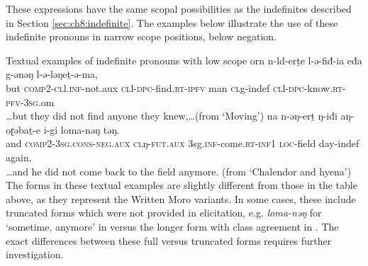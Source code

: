 These expressions have the same scopal possibilities as the indefinites described in Section \ref{sec:ch8:indefinite}. The examples below illustrate the use of these indefinite pronouns in narrow scope positions, below negation.

\ea Textual examples of indefinite pronouns with low scope
\ea \gll orn n-ld-erṯe l-ǝ-fiđ-ia eđa g-ǝnǝŋ l-ǝ-lǝŋeṯ-ǝ-ma,\\
but \textsc{comp}2-\textsc{cl}l.\textsc{inf}-not.aux \textsc{cl}l-\textsc{dpc}-find.\textsc{rt}-\textsc{ipfv} man \textsc{cl}g-indef \textsc{cl}l-\textsc{dpc}-know.\textsc{rt}-\textsc{pfv}-3\textsc{sg}.om\\
\glt \ldots but they did not find anyone they knew,\ldots \hfill (from `Moving')
\ex \gll  na n-ǝŋ-erṯ ŋ-iđi aŋ-oɽǝbaṯ-e i-gi loma-nǝŋ tǝŋ.\\
and \textsc{comp}2-3\textsc{sg}.\textsc{cons}-\textsc{neg.aux} \textsc{cl}ŋ-\textsc{fut.aux} 3sg.\textsc{inf}-come.\textsc{rt}-\textsc{inf}1 \textsc{loc}-field day-indef again.\\
\glt \ldots and he did not come back to the field anymore.  \hfill (from `Chalendor and hyena')\label{anymore}
\z 
\z 
The forms in these textual examples are slightly different from those in the table above, as they represent the Written Moro variants. In some cases, these include truncated forms which were not provided in elicitation, e.g. \textit{loma-nǝŋ} for `sometime, anymore' in  versus the longer form with class agreement in . The exact differences between these full versus truncated forms requires further investigation. 








